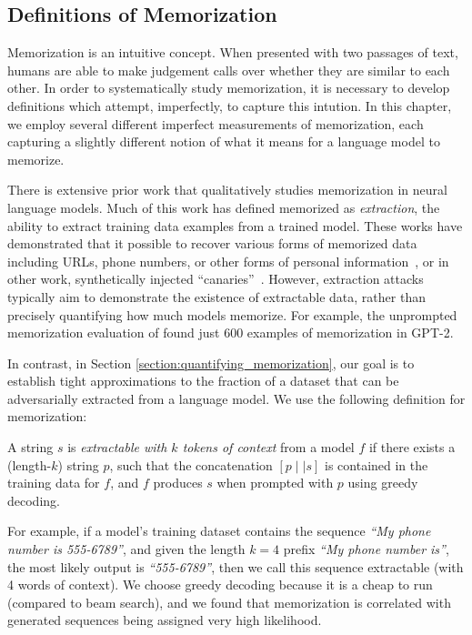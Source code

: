 \subsection{Definitions of Memorization}
\label{sec:mem-def}

Memorization is an intuitive concept.
When presented with two passages of text, humans are able to make judgement calls over whether they are similar to each other.
In order to systematically study memorization, it is necessary to develop definitions which attempt, imperfectly, to capture this intution.
In this chapter, we employ several different imperfect measurements of memorization, each capturing a slightly different notion of what it means for a language model to memorize.

There is extensive prior work that qualitatively studies memorization in neural language models.
Much of this work has defined memorized as \emph{extraction}, the ability to extract training data examples from a trained model.
These works have demonstrated that it possible to recover various forms of memorized data including URLs, phone numbers, or other forms of personal information~\citep{carlini2020extracting, ziegler2021copilot}, or in other work, synthetically injected ``canaries''~\citep{carlini2019secret, henderson2017ethical, thakkar2020understanding, thomas2020investigating}.
%
However, extraction attacks typically aim to demonstrate the existence of extractable data, rather than precisely quantifying how much models memorize.
For example, the unprompted memorization evaluation of \citet{carlini2020extracting} found just 600 examples of memorization in GPT-2.

In contrast, in Section \ref{section:quantifying_memorization}, our goal is to establish tight approximations to the fraction of a dataset that can be adversarially extracted from a language model.
We use the following definition for memorization:

%
\begin{definition}
A string $s$ is \emph{extractable with $k$ tokens of context} from a model $f$ if there exists a (length-$k$) string $p$, such that the concatenation $[p \mid \mid s]$ is contained in the training data for $f$, and $f$ produces $s$ when prompted with $p$ using greedy decoding.
\label{def:extractable}
\end{definition}

For example, if a model's training dataset contains the sequence \textit{``My phone number is 555-6789''},
and given the length $k=4$ prefix \textit{``My phone number is''}, the most likely output is \textit{``555-6789''}, then we call this sequence extractable (with 4 words of context).
We choose greedy decoding because it is a cheap to run (compared to beam search), and we found that memorization is correlated with generated sequences being assigned very high likelihood.


